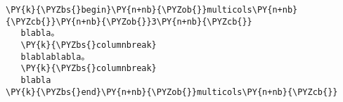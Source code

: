 \begin{Verbatim}[commandchars=\\\{\}]
\PY{k}{\PYZbs{}begin}\PY{n+nb}{\PYZob{}}multicols\PY{n+nb}{\PYZcb{}}\PY{n+nb}{\PYZob{}}3\PY{n+nb}{\PYZcb{}}
   blabla。
   \PY{k}{\PYZbs{}columnbreak}
   blablablabla。
   \PY{k}{\PYZbs{}columnbreak}
   blabla
\PY{k}{\PYZbs{}end}\PY{n+nb}{\PYZob{}}multicols\PY{n+nb}{\PYZcb{}}
\end{Verbatim}
